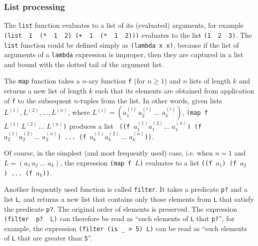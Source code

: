 

\subsubsection{List processing}

The \texttt{list} function evaluates to a list of its (evaluated) arguments,
for example \texttt{(list\,\,1\,\,(*\,\,1\,\,2)\,(+\,\,1\,\,(*\,\,1\,\,2)))}
evaluates to the list \texttt{(1\,\,2\,\,3)}. The \texttt{list} function
could be defined simply as \texttt{(lambda x x)}, because if the list
of arguments of a \texttt{lambda} expression is improper, then they
are captured in a list and bound with the dotted tail of the argument list.

The \texttt{map} function takes a $n$-ary function \texttt{f} (for $n \ge 1$)
and $n$ lists of length $k$ and returns a new list of length $k$
such that its elements are obtained from application of \texttt{f}
to the subsequent $n$-tuples from the list. In other words, given lists
$L^{(1)}, L^{(2)}, ..., L^{(n)}$, where
$L^{(i)}=(a_1^{(i)}\,a_2^{(i)}\,...\,\,a_k^{(i)})$,
\texttt{(map f $L^{(1)}\,L^{(2)}\,...\,\,L^{(n)}$)} produces a list
\texttt{
  ((f\,$a_1^{(1)} a_1^{(2)} ...\,\,a_1^{(n)}$)
  (f\,$a_2^{(1)} a_2^{(2)} ...\,\,a_2^{(n)}$)\,...
  (f\,$a_k^{(1)} a_k^{(2)}\,...\,\,a_k^{(n)}$))}.

Of course, in the simplest (and most frequently used) case, i.e. when ${n=1}$
and $L = (a_1\,a_2\,...\,\,a_k)$, the expression \texttt{(map f $L$)}
evaluates to a list \texttt{((f\,$a_1$)\,(f\,$a_2$)\,...\,(f\,$a_k$))}.

Another frequently used function is called \texttt{filter}. It takes
a predicate \texttt{p?} and a list \texttt{L}, and returns a new list
that contains only those elements from \texttt{L} that satisfy the
predicate \texttt{p?}. The original order of elements is preserved.
The expression \texttt{(filter\,\,p?\,\,L)} can therefore be read
as ``such elements of \texttt{L} that \texttt{p?}'', for example,
the expression \texttt{(filter (is \_ > 5) L)} can be read
as ``such elements of \texttt{L} that are greater than \texttt{5}''.

